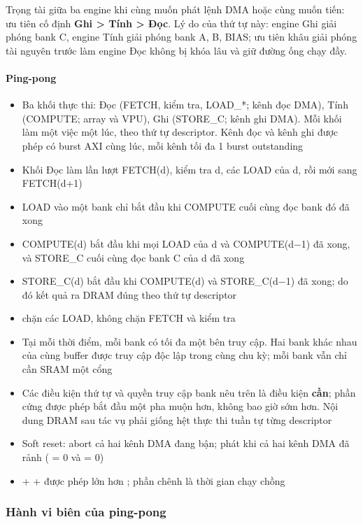 Trọng tài giữa ba engine khi cùng muốn phát lệnh DMA hoặc cùng muốn tiến: ưu tiên cố định
\textbf{Ghi > Tính > Đọc}. Lý do của thứ tự này: engine Ghi giải phóng bank C, engine Tính giải
phóng bank A, B, BIAS; ưu tiên khâu giải phóng tài nguyên trước làm engine Đọc không bị khóa lâu và
giữ đường ống chạy đầy.

\paragraph{Ping-pong}\label{par:5-8}
\begin{itemize}
\item Ba khối thực thi: Đọc (FETCH, kiểm tra, LOAD\_*; kênh đọc DMA), Tính (COMPUTE; array và VPU), Ghi (STORE\_C; kênh ghi DMA). Mỗi khối làm một việc một lúc, theo thứ tự descriptor. Kênh đọc và kênh ghi được phép có burst AXI cùng lúc, mỗi kênh tối đa 1 burst outstanding
\item Khối Đọc làm lần lượt FETCH(d), kiểm tra d, các LOAD của d, rồi mới sang FETCH(d+1)
\item LOAD vào một bank chỉ bắt đầu khi COMPUTE cuối cùng đọc bank đó đã xong
\item COMPUTE(d) bắt đầu khi mọi LOAD của d và COMPUTE(d−1) đã xong, và STORE\_C cuối cùng đọc bank C của d đã xong
\item STORE\_C(d) bắt đầu khi COMPUTE(d) và STORE\_C(d−1) đã xong; do đó kết quả ra DRAM đúng theo thứ tự descriptor
\item {} chặn các LOAD, không chặn FETCH và kiểm tra
\item Tại mỗi thời điểm, mỗi bank có tối đa một bên truy cập. Hai bank khác nhau của cùng buffer được truy cập độc lập trong cùng chu kỳ; mỗi bank vẫn chỉ cần SRAM một cổng
\item Các điều kiện thứ tự và quyền truy cập bank nêu trên là điều kiện \textbf{cần}; phần cứng được phép bắt đầu một pha muộn hơn, không bao giờ sớm hơn. Nội dung DRAM sau tác vụ phải giống hệt thực thi tuần tự từng descriptor
\item Soft reset: abort cả hai kênh DMA đang bận;  phát khi cả hai kênh DMA đã rảnh ( = 0 và  = 0)
\item {} +  +  được phép lớn hơn ; phần chênh là thời gian chạy chồng
\end{itemize}

\subsubsection{Hành vi biên của ping-pong}\label{sec:5.3.2}

